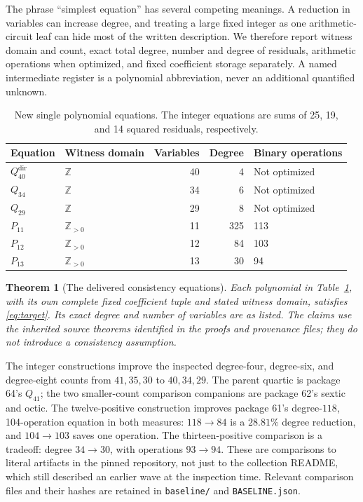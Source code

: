 \documentclass[11pt,letterpaper]{article}
\newtheorem{theorem}{Theorem}[section]
\theoremstyle{remark}
\newcommand{\Z}{\mathbb Z}
\begin{document}
The phrase ``simplest equation'' has several competing meanings.  A
reduction in variables can increase degree, and treating a large fixed
integer as one arithmetic-circuit leaf can hide most of the written
description.  We therefore report witness domain and count, exact total
degree, number and degree of residuals, arithmetic operations when
optimized, and fixed coefficient storage separately.  A named intermediate
register is a polynomial abbreviation, never an additional quantified
unknown.

\begin{table}[ht]
\centering
\small
\begin{tabular}{@{}llrrl@{}}
\toprule
Equation & Witness domain & Variables & Degree & Binary operations\\
\midrule
$Q_{40}^{\mathrm{dir}}$ & $\Z$ & 40 & 4 & Not optimized\\
$Q_{34}$ & $\Z$ & 34 & 6 & Not optimized\\
$Q_{29}$ & $\Z$ & 29 & 8 & Not optimized\\
$P_{11}$ & $\Z_{>0}$ & 11 & 325 & 113\\
$P_{12}$ & $\Z_{>0}$ & 12 & 84 & 103\\
$P_{13}$ & $\Z_{>0}$ & 13 & 30 & 94\\
\bottomrule
\end{tabular}
\caption{New single polynomial equations.  The integer equations are
sums of 25, 19, and 14 squared residuals, respectively.}
\label{tab:new}
\end{table}

\begin{theorem}[The delivered consistency equations]
Each polynomial in Table~\ref{tab:new}, with its own complete fixed
coefficient tuple and stated witness domain, satisfies
\eqref{eq:target}.  Its exact degree and number of variables are as
listed.  The claims use the inherited source theorems identified in the
proofs and provenance files; they do not introduce a consistency
assumption.
\end{theorem}

The integer constructions improve the inspected degree-four, degree-six,
and degree-eight counts from $41,35,30$ to $40,34,29$.  The parent quartic
is package 64's $Q_{41}$; the two smaller-count comparison companions are
package 62's sextic and octic.  The twelve-positive construction improves
package 61's degree-$118$, 104-operation equation in both measures:
$118\to84$ is a $28.81\%$ degree reduction, and $104\to103$ saves one
operation.  The thirteen-positive comparison is a tradeoff:
degree $34\to30$, with operations $93\to94$.  These are comparisons to
literal artifacts in the pinned repository, not just to the collection
README, which still described an earlier wave at the inspection time.
Relevant comparison files and their hashes are retained in
\texttt{baseline/} and \texttt{BASELINE.json}.
\end{document}
